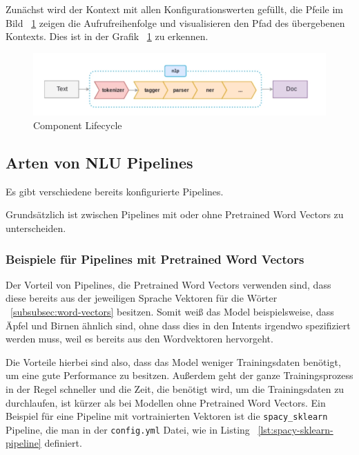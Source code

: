 Zunächst wird der Kontext mit allen Konfigurationswerten gefüllt, die Pfeile im Bild ~\ref{fig:pipeline_image} zeigen die Aufrufreihenfolge und visualisieren den Pfad des übergebenen Kontexts.\cite{componentLifecycle, componentLifecycleDoc}
Dies ist in der Grafik ~\ref{fig:pipeline_image} zu erkennen.

\begin{figure}[hbt!]
    \centering
    \includegraphics[scale=0.5]{pics/pipeline}
    \caption{Component Lifecycle~\cite{pipelineImage}}
    \label{fig:pipeline_image}
\end{figure}

\subsection{Arten von NLU Pipelines}\label{subsec:pipeline-types}

Es gibt verschiedene bereits konfigurierte Pipelines.\cite{howToChooseAPipeline}

Grundsätzlich ist zwischen Pipelines mit oder ohne Pretrained Word Vectors zu unterscheiden.

\subsubsection{Beispiele für Pipelines mit Pretrained Word Vectors}

Der Vorteil von Pipelines, die Pretrained Word Vectors verwenden sind, dass diese bereits aus der jeweiligen Sprache Vektoren für die Wörter ~\ref{subsubsec:word-vectors} besitzen.
Somit weiß das Model beispielsweise, dass Äpfel und Birnen ähnlich sind, ohne dass dies in den Intents irgendwo spezifiziert werden muss, weil es bereits aus den Wordvektoren hervorgeht.\cite{differenceStackOverflow, rasaMasterclassPreConfiguredPipelines}

Die Vorteile hierbei sind also, dass das Model weniger Trainingsdaten benötigt, um eine gute Performance zu besitzen.
Außerdem geht der ganze Trainingsprozess in der Regel schneller und die Zeit, die benötigt wird, um die Trainingsdaten zu durchlaufen, ist kürzer als bei Modellen ohne Pretrained Word Vectors.\cite{differenceStackOverflow, pretrainedVsSupervised, rasaMasterclassPreConfiguredPipelines}
Ein Beispiel für eine Pipeline mit vortrainierten Vektoren ist die \texttt{spacy\_sklearn} Pipeline, die man in der \texttt{config.yml} Datei, wie in Listing ~\ref{lst:spacy-sklearn-pipeline} definiert.

